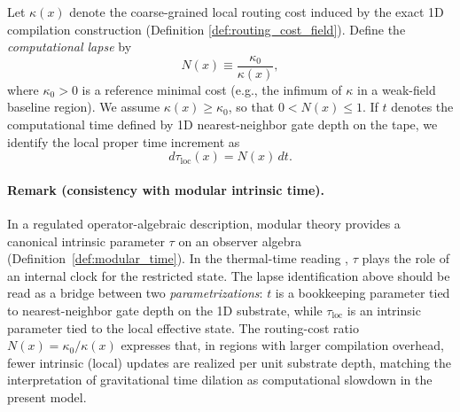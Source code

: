 \begin{definition}
\label{def:computational_lapse}
Let $\kappa(x)$ denote the coarse-grained local routing cost induced by the exact 1D compilation construction (Definition \ref{def:routing_cost_field}). Define the \emph{computational lapse} by
\begin{equation}
    N(x)\equiv \frac{\kappa_0}{\kappa(x)},
\end{equation}
where $\kappa_0>0$ is a reference minimal cost (e.g., the infimum of $\kappa$ in a weak-field baseline region). We assume $\kappa(x)\ge \kappa_0$, so that $0<N(x)\le 1$. If $t$ denotes the computational time defined by 1D nearest-neighbor gate depth on the tape, we identify the local proper time increment as
\begin{equation}
    d\tau_{\mathrm{loc}}(x)=N(x)\,dt.
\end{equation}
\end{definition}

\paragraph{Remark (consistency with modular intrinsic time).}
In a regulated operator-algebraic description, modular theory provides a canonical intrinsic parameter $\tau$ on an observer algebra (Definition~\ref{def:modular_time}). In the thermal-time reading \cite{ConnesRovelli1994}, $\tau$ plays the role of an internal clock for the restricted state. The lapse identification above should be read as a bridge between two \emph{parametrizations}: $t$ is a bookkeeping parameter tied to nearest-neighbor gate depth on the 1D substrate, while $\tau_{\mathrm{loc}}$ is an intrinsic parameter tied to the local effective state. The routing-cost ratio $N(x)=\kappa_0/\kappa(x)$ expresses that, in regions with larger compilation overhead, fewer intrinsic (local) updates are realized per unit substrate depth, matching the interpretation of gravitational time dilation as computational slowdown in the present model.


